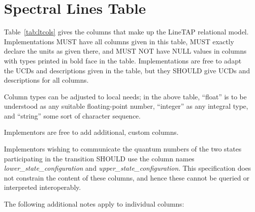 \documentclass[11pt,a4paper]{ivoa}
\begin{document}
\section{Spectral Lines Table}\label{sect:quantities}

Table~\ref{tab:ltcols} gives the columns that make up the LineTAP
relational model.  Implementations MUST have all columns given in this
table, MUST exactly declare the units as given there, and MUST NOT have
NULL values in columns with types printed in bold face in the table.
Implementations are free to adapt the UCDs and descriptions given in the
table, but they SHOULD give UCDs and descriptions for all columns.

Column types can be adjusted to local needs; in the
above table, ``float'' is to be understood as any suitable
floating-point number, ``integer'' as any integral type, and ``string''
some sort of character sequence.

Implementors are free to add additional, custom columns.

Implementors wishing to communicate the quantum numbers of the two
states participating in the transition SHOULD use the column names
\textit{lo\-wer\_sta\-te\_configuration} and
\textit{up\-per\_sta\-te\_configuration}.  This specification does not
constrain the content of these columns, and hence these cannot be
queried or interpreted interoperably.

The following additional notes apply to individual columns:
\end{document}

